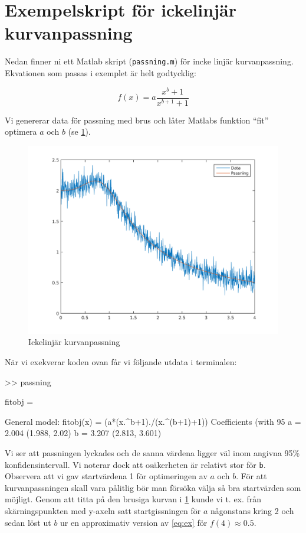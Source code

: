 \section{Exempelskript för ickelinjär kurvanpassning}
\label{sec:matlab-exempel}
Nedan finner ni ett Matlab skript ({\tt passning.m}) för incke linjär kurvanpassning.
Ekvationen som passas i exemplet är helt godtycklig:

\begin{equation}
  \label{eq:ex}
  f(x) = a\frac{x^b+1}{x^{b+1}+1}
\end{equation}

Vi genererar data för passning med brus och låter Matlabs funktion
``fit'' optimera $a$ och $b$ (se \cref{fig:matlab}).

\begin{figure}
  \centering
  \includegraphics[scale=0.5]{matlab/passning.png}
  \caption{Ickelinjär kurvanpassning}
  \label{fig:matlab}
\end{figure}


När vi exekverar koden ovan får vi följande utdata i terminalen:

\begin{terminaloutput}
>> passning

fitobj = 

     General model:
     fitobj(x) = (a*(x.^b+1)./(x.^(b+1)+1))
     Coefficients (with 95%
       a =       2.004  (1.988, 2.02)
       b =       3.207  (2.813, 3.601)
\end{terminaloutput}

Vi ser att passningen lyckades och de sanna värdena ligger väl inom
angivna 95\%  konfidensintervall. Vi noterar dock att osäkerheten är
relativt stor för {\tt b}. Observera att vi gav startvärdena 1 för
optimeringen av $a$ och $b$. För att kurvanpassningen skall vara pålitlig
bör man försöka välja så bra startvärden som möjligt. Genom att titta på
den brusiga kurvan i \cref{fig:matlab} kunde vi t. ex. från
skärningspunkten med y-axeln satt startgissningen för $a$ någonstans
kring 2 och sedan löst ut $b$ ur en approximativ version av \cref{eq:ex} för
$f(4) \approx 0.5$.